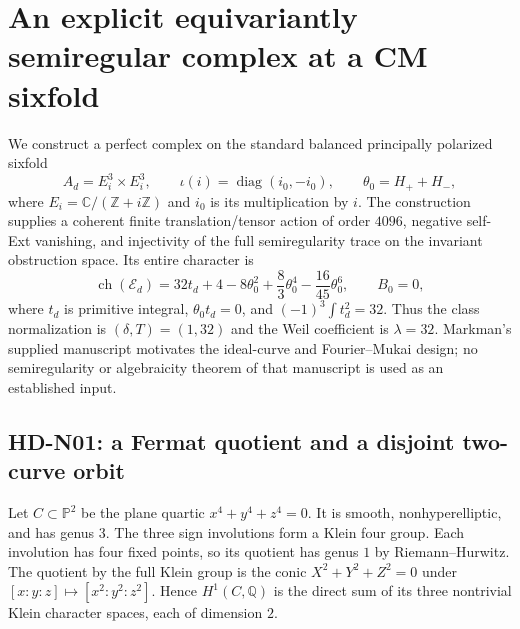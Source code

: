 \section{An explicit equivariantly semiregular complex at a CM sixfold}

We construct a perfect complex on the standard balanced principally
polarized sixfold
\[
 A_d=E_i^3\times E_i^3,\qquad
 \iota(i)=\operatorname{diag}(i_0,-i_0),\qquad
 \theta_0=H_++H_-,
\]
where $E_i=\mathbb C/(\mathbb Z+i\mathbb Z)$ and $i_0$ is its multiplication
by $i$. The construction supplies a coherent finite translation/tensor
action of order $4096$, negative self-Ext vanishing, and injectivity of
the full semiregularity trace on the invariant obstruction space. Its
entire character is
\begin{equation}\label{hd-n-final-character}
 \operatorname{ch}(\mathcal E_d)
 =32t_d+4-8\theta_0^2+\frac83\theta_0^4-\frac{16}{45}\theta_0^6,
 \qquad B_0=0,
\end{equation}
where $t_d$ is primitive integral, $\theta_0t_d=0$, and
$(-1)^3\int t_d^2=32$. Thus the class normalization is
$(\delta,T)=(1,32)$ and the Weil coefficient is $\lambda=32$.
Markman's supplied manuscript motivates the ideal-curve and Fourier--Mukai
design; no semiregularity or algebraicity theorem of that manuscript is
used as an established input.

\subsection{HD-N01: a Fermat quotient and a disjoint two-curve orbit}
\label{hd-n01}

Let $C\subset\mathbb P^2$ be the plane quartic
$x^4+y^4+z^4=0$. It is smooth, nonhyperelliptic, and has genus $3$.
The three sign involutions form a Klein four group. Each involution has
four fixed points, so its quotient has genus $1$ by Riemann--Hurwitz.
The quotient by the full Klein group is the conic
$X^2+Y^2+Z^2=0$ under $[x:y:z]\mapsto[x^2:y^2:z^2]$. Hence
$H^1(C,\mathbb Q)$ is the direct sum of its three nontrivial Klein
character spaces, each of dimension $2$.

